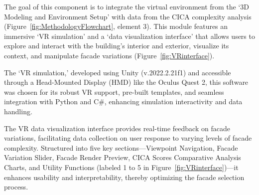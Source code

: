 %


The goal of this component is to integrate the virtual environment from the `3D Modeling and Environment Setup' with data from the CICA complexity analysis (Figure~\ref{fig:MethodologyFlowchart}, element 3).
This module features an immersive `VR simulation' and a `data visualization interface' that allows users to explore and interact with the building's interior and exterior, visualize its context, and manipulate facade variations (Figure~\ref{fig:VRinterface}).

The `VR simulation,' developed using Unity (v.2022.2.21f1) and accessible through a Head-Mounted Display (HMD) like the Oculus Quest 2, this software was chosen for its robust VR support, pre-built templates, and seamless integration with Python and C\#, enhancing simulation interactivity and data handling.

The VR data visualization interface provides real-time feedback on facade variations, facilitating data collection on user response to varying levels of facade complexity.
Structured into five key sections—Viewpoint Navigation, Facade Variation Slider, Facade Render Preview, CICA Scores Comparative Analysis Charts, and Utility Functions (labeled 1 to 5 in Figure~\ref{fig:VRinterface})—it enhances usability and interpretability, thereby optimizing the facade selection process.





